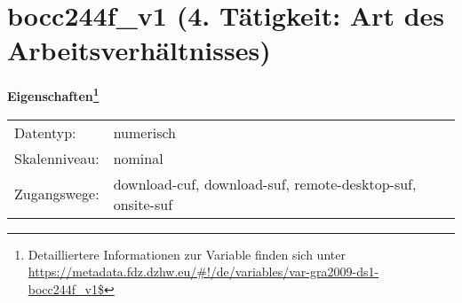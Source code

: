 
    \setcounter{footnote}{0}

    \vspace*{-1.8cm}
	\section{bocc244f\_v1 (4. Tätigkeit: Art des Arbeitsverhältnisses)}
	\label{section:bocc244f_v1}



    \vspace*{0.5cm}
    \noindent\textbf{Eigenschaften\footnote{Detailliertere Informationen zur Variable finden sich unter
		\url{https://metadata.fdz.dzhw.eu/\#!/de/variables/var-gra2009-ds1-bocc244f_v1$}}}\\
	\begin{tabularx}{\hsize}{@{}lX}
	Datentyp: & numerisch \\
	Skalenniveau: & nominal \\
	Zugangswege: &
	  download-cuf, 
	  download-suf, 
	  remote-desktop-suf, 
	  onsite-suf
 \\
    \end{tabularx}



